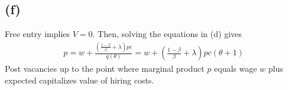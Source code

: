 \documentclass{ltjsarticle}
\begin{document}
\subsection*{(f)}

Free entry implies $V=0$. Then, solving the equations in (d) gives
\begin{gather*}
  p = w + \frac{\left(\frac{1-\beta}{\beta} + \lambda\right)pc}{q(\theta)} =  w + \left(\frac{1-\beta}{\beta} + \lambda\right)pc (\theta+1)
\end{gather*}
Post vacancies up to the point where marginal product $p$ equals wage $w$ plus expected capitalizes value of hiring costs.
\end{document}
